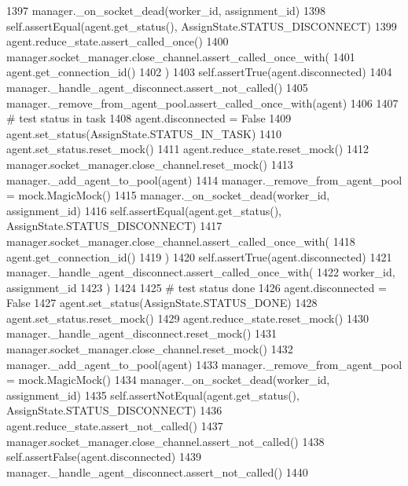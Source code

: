 \begin{DoxyCode}
1397         manager.\_on\_socket\_dead(worker\_id, assignment\_id)
1398         self.assertEqual(agent.get\_status(), AssignState.STATUS\_DISCONNECT)
1399         agent.reduce\_state.assert\_called\_once()
1400         manager.socket\_manager.close\_channel.assert\_called\_once\_with(
1401             agent.get\_connection\_id()
1402         )
1403         self.assertTrue(agent.disconnected)
1404         manager.\_handle\_agent\_disconnect.assert\_not\_called()
1405         manager.\_remove\_from\_agent\_pool.assert\_called\_once\_with(agent)
1406 
1407         \textcolor{comment}{# test status in task}
1408         agent.disconnected = \textcolor{keyword}{False}
1409         agent.set\_status(AssignState.STATUS\_IN\_TASK)
1410         agent.set\_status.reset\_mock()
1411         agent.reduce\_state.reset\_mock()
1412         manager.socket\_manager.close\_channel.reset\_mock()
1413         manager.\_add\_agent\_to\_pool(agent)
1414         manager.\_remove\_from\_agent\_pool = mock.MagicMock()
1415         manager.\_on\_socket\_dead(worker\_id, assignment\_id)
1416         self.assertEqual(agent.get\_status(), AssignState.STATUS\_DISCONNECT)
1417         manager.socket\_manager.close\_channel.assert\_called\_once\_with(
1418             agent.get\_connection\_id()
1419         )
1420         self.assertTrue(agent.disconnected)
1421         manager.\_handle\_agent\_disconnect.assert\_called\_once\_with(
1422             worker\_id, assignment\_id
1423         )
1424 
1425         \textcolor{comment}{# test status done}
1426         agent.disconnected = \textcolor{keyword}{False}
1427         agent.set\_status(AssignState.STATUS\_DONE)
1428         agent.set\_status.reset\_mock()
1429         agent.reduce\_state.reset\_mock()
1430         manager.\_handle\_agent\_disconnect.reset\_mock()
1431         manager.socket\_manager.close\_channel.reset\_mock()
1432         manager.\_add\_agent\_to\_pool(agent)
1433         manager.\_remove\_from\_agent\_pool = mock.MagicMock()
1434         manager.\_on\_socket\_dead(worker\_id, assignment\_id)
1435         self.assertNotEqual(agent.get\_status(), AssignState.STATUS\_DISCONNECT)
1436         agent.reduce\_state.assert\_not\_called()
1437         manager.socket\_manager.close\_channel.assert\_not\_called()
1438         self.assertFalse(agent.disconnected)
1439         manager.\_handle\_agent\_disconnect.assert\_not\_called()
1440 
\end{DoxyCode}


